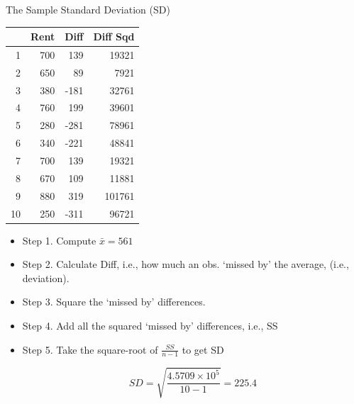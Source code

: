 \documentclass[14pt]{beamer}\usepackage[]{graphicx}\usepackage[]{color}
\begin{document}
\begin{frame}[fragile]{The Sample Standard Deviation (SD)}

\begin{minipage}[ht]{5cm}

{\footnotesize{
\begin{table}[ht]
\centering
\begin{tabular}{rrrr}
  \hline
 & Rent & Diff & Diff Sqd \\ 
  \hline
1 & 700 & 139 & 19321 \\ 
  2 & 650 & 89 & 7921 \\ 
  3 & 380 & -181 & 32761 \\ 
  4 & 760 & 199 & 39601 \\ 
  5 & 280 & -281 & 78961 \\ 
  6 & 340 & -221 & 48841 \\ 
  7 & 700 & 139 & 19321 \\ 
  8 & 670 & 109 & 11881 \\ 
  9 & 880 & 319 & 101761 \\ 
  10 & 250 & -311 & 96721 \\ 
   \hline
\end{tabular}
\end{table}

}}

\end{minipage}
\begin{minipage}[ht]{6cm}

{\footnotesize{
\begin{itemize}
\item<1-> Step 1. Compute $\bar{x} = 561$
\item<2-> Step 2. Calculate Diff, i.e., how much an obs. `missed by' the average, (i.e., deviation).
\item<3-> Step 3. Square the `missed by' differences.
\item<4-> Step 4. Add all the squared `missed by' differences, i.e., SS
\item<5-> Step 5. Take the square-root of $\frac{SS}{n - 1}$ to get SD

\begin{equation*}
SD = \sqrt{ \frac{\ensuremath{4.5709\times 10^{5}}}{ 10 - 1 }} = 225.4
\end{equation*}

\end{itemize}
}}
\end{minipage}

\end{frame}
\end{document}
